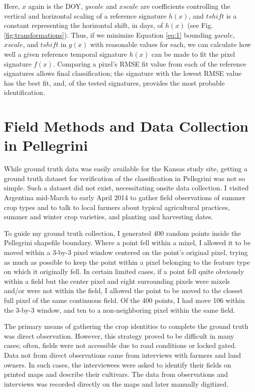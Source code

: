 Here, $x$ again is the DOY, $yscale$ and  $xscale$ are coefficients controlling the vertical and horizontal scaling of a reference signature $h(x)$, and $tshift$ is a constant representing the horizontal shift, in days, of $h(x)$ (see Fig. \ref{fig:transformations}). Thus, if we minimize Equation \ref{eq:1} bounding $yscale$, $xscale$, and $tshift$  in $g(x)$ with reasonable values for each, we can calculate how well a given reference temporal signature $h(x)$ can be made to fit the pixel signature $f(x)$. Comparing a pixel's RMSE fit value from each of the reference signatures allows final classification; the signature with the lowest RMSE value has the best fit, and, of the tested signatures, provides the most probable identification.

\section{Field Methods and Data Collection in Pellegrini}

While ground truth data was easily available for the Kansas study site, getting a ground truth dataset for verification of the classification in Pellegrini was not so simple. Such a dataset did not exist, necessitating onsite data collection. I visited Argentina mid-March to early April 2014 to gather field observations of summer crop types and to talk to local farmers about typical agricultural practices, summer and winter crop varieties, and planting and harvesting dates.

To guide my ground truth collection, I generated 400 random points inside the Pellegrini shapefile boundary. Where a point fell within a mixel, I allowed it to be moved within a 3-by-3 pixel window centered on the point's original pixel, trying as much as possible to keep the point within a pixel belonging to the feature type on which it originally fell. In certain limited cases, if a point fell quite obviously within a field but the center pixel and eight surrounding pixels were mixels and/or were not within the field, I allowed the point to be moved to the closest full pixel of the same continuous field. Of the 400 points, I had move 106 within the 3-by-3 window, and ten to a non-neighboring pixel within the same field.

The primary means of gathering the crop identities to complete the ground truth was direct observation. However, this strategy proved to be difficult in many cases; often, fields were not accessible due to road conditions or locked gated. Data not from direct observations came from interviews with farmers and land owners. In such cases, the interviewees were asked to identify their fields on printed maps and describe their cultivars. The data from observations and interviews was recorded directly on the maps and later manually digitized.

